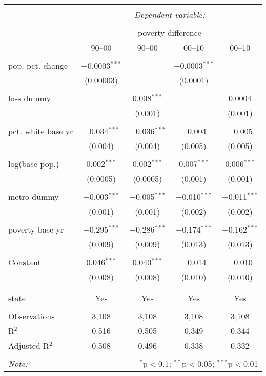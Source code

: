 \documentclass{standalone}
\begin{document}
\begin{tabular}{@{\extracolsep{5pt}}lcccc} 
\\[-1.8ex]\hline 
\hline \\[-1.8ex] 
 & \multicolumn{4}{c}{\textit{Dependent variable:}} \\ 
\cline{2-5} 
\\[-1.8ex] & \multicolumn{4}{c}{poverty difference} \\ 
 & 90--00 & 90--00 & 00--10 & 00--10 \\ 
\hline \\[-1.8ex] 
 pop. pct. change & $-$0.0003$^{***}$ &  & $-$0.0003$^{***}$ &  \\ 
  & (0.00003) &  & (0.0001) &  \\ 
  & & & & \\ 
 loss dummy &  & 0.008$^{***}$ &  & 0.0004 \\ 
  &  & (0.001) &  & (0.001) \\ 
  & & & & \\ 
 pct. white base yr & $-$0.034$^{***}$ & $-$0.036$^{***}$ & $-$0.004 & $-$0.005 \\ 
  & (0.004) & (0.004) & (0.005) & (0.005) \\ 
  & & & & \\ 
 log(base pop.) & 0.002$^{***}$ & 0.002$^{***}$ & 0.007$^{***}$ & 0.006$^{***}$ \\ 
  & (0.0005) & (0.0005) & (0.001) & (0.001) \\ 
  & & & & \\ 
 metro dummy & $-$0.003$^{***}$ & $-$0.005$^{***}$ & $-$0.010$^{***}$ & $-$0.011$^{***}$ \\ 
  & (0.001) & (0.001) & (0.002) & (0.002) \\ 
  & & & & \\ 
 poverty base yr & $-$0.295$^{***}$ & $-$0.286$^{***}$ & $-$0.174$^{***}$ & $-$0.162$^{***}$ \\ 
  & (0.009) & (0.009) & (0.013) & (0.013) \\ 
  & & & & \\ 
 Constant & 0.046$^{***}$ & 0.040$^{***}$ & $-$0.014 & $-$0.010 \\ 
  & (0.008) & (0.008) & (0.010) & (0.010) \\ 
  & & & & \\ 
\hline \\[-1.8ex] 
state & Yes & Yes & Yes & Yes \\ 
\hline \\[-1.8ex] 
Observations & 3,108 & 3,108 & 3,108 & 3,108 \\ 
R$^{2}$ & 0.516 & 0.505 & 0.349 & 0.344 \\ 
Adjusted R$^{2}$ & 0.508 & 0.496 & 0.338 & 0.332 \\ 
\hline 
\hline \\[-1.8ex] 
\textit{Note:}  & \multicolumn{4}{r}{$^{*}$p$<$0.1; $^{**}$p$<$0.05; $^{***}$p$<$0.01} \\ 
\end{tabular} 
\end{document}
